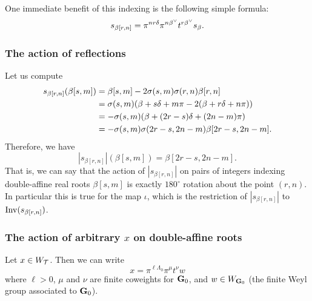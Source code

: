 \documentclass[10pt]{amsart}
\begin{document}
One immediate benefit of this indexing is the following simple formula:
\begin{equation}\label{double-affine-refl}
s_{\beta[r,n]} = \pi^{nr\delta} \pi^{n\betacheck} t^{r\betacheck} s_\beta.
\end{equation}

\subsubsection{The action of reflections}

Let us compute
\begin{align}\label{eq:reflection-formula}
s_{\beta[r,n]}(\beta[s,m]) &= \beta[s,m] - 2 \sigma(s,m) \sigma(r,n) \beta[r,n]\\
&= \sigma(s,m) (\beta + s \delta + m \pi - 2(\beta + r \delta + n \pi))\notag\\
&= -\sigma(s,m) (\beta + (2r-s)\delta + (2n-m)\pi)\notag\\
&= -\sigma(s,m) \sigma(2r-s,2n-m) \beta[2r-s,2n-m]\notag.
\end{align}
Therefore, we have
\begin{equation}
|s_{\beta[r,n]}| (\beta[s,m]) = \beta[2r-s,2n-m].
\end{equation}
That is, we can say that the action of $|s_{\beta[r,n]}|$ on pairs of integers indexing double-affine real roots $\beta[s,m]$ is exactly $180^\circ$ rotation about the point $(r,n)$. In particular this is true for the map $\iota$, which is the restriction of $|s_{\beta[r,n]}|$ to $\operatorname{Inv}(s_{\beta[r,n]})$.

\subsubsection{The action of arbitrary \texorpdfstring{$x$}{x} on double-affine roots}

Let $x \in W_{\mathcal{T}}$. Then we can write
\begin{equation}\label{eq:2}
x = \pi^{\ell \Lambda_0} \pi^{\mu} t^{\nu} w
\end{equation}
where $\ell > 0$, $\mu$ and $\nu$ are finite coweights for $\mathbf{G}_0$, and $w \in W_{\mathbf{G}_0}$ (the finite Weyl group associated to $\mathbf{G}_0$).
\end{document}
